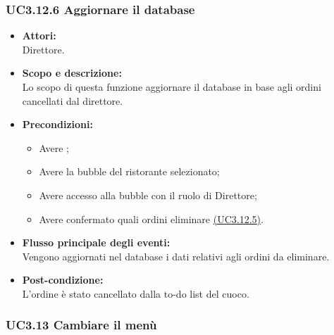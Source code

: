 \subsubsection{UC3.12.6 Aggiornare il database} \label{UC3.12.6}

\begin{itemize}
	\item \textbf{Attori:}
	\\Direttore.
	\item \textbf{Scopo e descrizione:} 
	\\Lo scopo di questa funzione aggiornare il database in base agli ordini cancellati dal direttore.
	\item \textbf{Precondizioni:}
	\begin{itemize}
		\item Avere ;
		\item Avere la bubble del ristorante selezionato;
		\item Avere accesso alla bubble con il ruolo di Direttore;
		\item Avere confermato quali ordini eliminare \hyperref[UC3.12.5]{(UC3.12.5)}.
	\end{itemize}
	\item \textbf{Flusso principale degli eventi:}
	\\Vengono aggiornati nel database i dati relativi agli ordini da eliminare.
	\item \textbf{Post-condizione:}
	\\L’ordine è stato cancellato dalla to-do list del cuoco.
\end{itemize}

\subsubsection{UC3.13 Cambiare il menù} \label{UC3.13}

